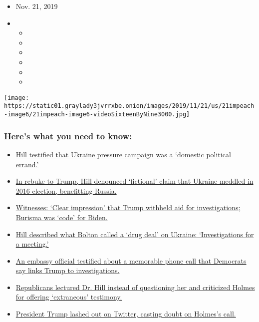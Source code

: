 \begin{itemize}
\item
  Nov. 21, 2019
\item
  \begin{itemize}
  \item
  \item
  \item
  \item
  \item
  \item
  \end{itemize}
\end{itemize}

\texttt{[image: https://static01.graylady3jvrrxbe.onion/images/2019/11/21/us/21impeach-image6/21impeach-image6-videoSixteenByNine3000.jpg]}

\hypertarget{heres-what-you-need-to-know}{%
\subsubsection{Here's what you need to
know:}\label{heres-what-you-need-to-know}}

\begin{itemize}
\tightlist
\item
  \protect\hyperlink{link-69e7e420}{Hill testified that Ukraine pressure
  campaign was a `domestic political errand.'}
\item
  \protect\hyperlink{link-30488cd2}{In rebuke to Trump, Hill denounced
  `fictional' claim that Ukraine meddled in 2016 election, benefitting
  Russia.}
\item
  \protect\hyperlink{link-7876105c}{Witnesses: `Clear impression' that
  Trump withheld aid for investigations; Burisma was `code' for Biden.}
\item
  \protect\hyperlink{link-679b5ee2}{Hill described what Bolton called a
  `drug deal' on Ukraine: `Investigations for a meeting.'}
\item
  \protect\hyperlink{link-46b315d7}{An embassy official testified about
  a memorable phone call that Democrats say links Trump to
  investigations.}
\item
  \protect\hyperlink{link-1488119b}{Republicans lectured Dr. Hill
  instead of questioning her and criticized Holmes for offering
  `extraneous' testimony.}
\item
  \protect\hyperlink{link-360100b6}{President Trump lashed out on
  Twitter, casting doubt on Holmes's call.}
\end{itemize}

